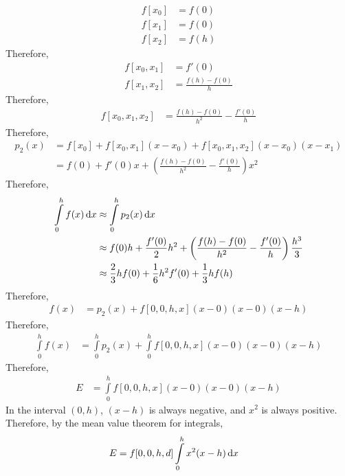 \documentclass[fleqn, a4paper, 12pt, twoside]{article}
\theoremstyle{definition}
\theoremstyle{theorem}
\begin{document}
\begin{solution}
	\begin{align*}
		f[x_0] & = f(0) \\
		f[x_1] & = f(0) \\
		f[x_2] & = f(h)
	\end{align*}
	Therefore,
	\begin{align*}
		f[x_0,x_1] & = f'(0) \\
		f[x_1,x_2] & = \frac{f(h) - f(0)}{h}
	\end{align*}
	Therefore,
	\begin{align*}
		f[x_0,x_1,x_2] & = \frac{f(h) - f(0)}{h^2} - \frac{f'(0)}{h}
	\end{align*}
	Therefore,
	\begin{align*}
		p_2(x) & = f[x_0] + f[x_0,x_1] (x - x_0) + f[x_0,x_1,x_2] (x - x_0) (x - x_1) \\
                       & = f(0) + f'(0) x + \left( \frac{f(h) - f(0)}{h^2} - \frac{f'(0)}{h} \right) x^2
	\end{align*}
	Therefore,
	\begin{align*}
		\int\limits_{0}^{h} f(x) \dif x & \approx \int\limits_{0}^{h} p_2(x) \dif x                                                                     \\
                                                & \approx f(0) h + \frac{f'(0)}{2} h^2 + \left( \frac{f(h) - f(0)}{h^2} - \frac{f'(0)}{h} \right) \frac{h^3}{3} \\
                                                & \approx \frac{2}{3} h f(0) + \frac{1}{6} h^2 f'(0) + \frac{1}{3} h f(h)
	\end{align*}
	Therefore,
	\begin{align*}
		f(x) & = p_2(x) + f[0,0,h,x] (x - 0) (x - 0) (x - h)
	\end{align*}
	Therefore,
	\begin{align*}
		\int\limits_{0}^{h} f(x) & = \int\limits_{0}^{h} p_2(x) + \int\limits_{0}^{h} f[0,0,h,x] (x - 0) (x - 0) (x - h)
	\end{align*}
	Therefore,
	\begin{align*}
		E & = \int\limits_{0}^{h} f[0,0,h,x] (x - 0) (x - 0) (x - h)
	\end{align*}
	In the interval $(0,h)$, $(x - h)$ is always negative, and $x^2$ is always positive.
	Therefore, by the mean value theorem for integrals,
	\begin{align*}
		E & = f[0,0,h,d] \int\limits_{0}^{h} x^2 (x - h) \dif x
	\end{align*}

\end{solution}
\end{document}
